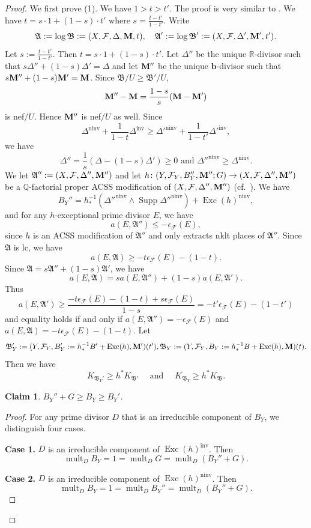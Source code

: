 \documentclass[11pt,reqno]{amsart}
\numberwithin{equation}{section}
\newcommand{\bb}{\bm{b}}
\newcommand{\Mm}{{\bf{M}}}
\newcommand{\Exc}{\operatorname{Exc}}
\newcommand{\ninv}{\operatorname{ninv}}
\newcommand{\inv}{\operatorname{inv}}
\newcommand{\Supp}{\operatorname{Supp}}
\newcommand{\mult}{\operatorname{mult}}
\newcommand{\Aa}{{\mathfrak{A}}}
\newcommand{\Bb}{{\mathfrak{B}}}
\newcommand{\Ff}{\mathcal{F}}
\newtheorem{claim}[thm]{Claim}
\theoremstyle{definition}
\begin{document}
\begin{proof}
We first prove (1). We have $1>t>t'$. The proof is very similar to \cite[Proof of Proposition~3.3]{Cas+24}. We have $t=s\cdot 1+(1-s)\cdot t'$ where $s=\frac{t-t'}{1-t'}$. Write
$$\Aa:=\log\Bb:=(X,\Ff,\Delta,\Mm,t),\quad \Aa':=\log\Bb':=(X,\Ff,\Delta',\Mm',t').$$
Let $s:=\frac{t-t'}{1-t'}$. Then $t=s\cdot 1+(1-s)\cdot t'$. Let $\Delta''$ be the unique $\mathbb R$-divisor such that $s\Delta''+(1-s)\Delta'=\Delta$ and let $\Mm''$ be the unique $\bb$-divisor such that $s\Mm''+(1-s)\Mm'=\Mm$. Since $\Bb/U\geq\Bb'/U$,
$$\Mm''-\Mm=\frac{1-s}{s}(\Mm-\Mm')$$
is nef$/U$. Hence $\Mm''$ is nef$/U$ as well. Since
$$\Delta^{\ninv}+\frac{1}{1-t}\Delta^{\inv}\geq\Delta'^{\ninv}+\frac{1}{1-t'}\Delta'^{\inv},$$
we have 
$$\Delta''=\frac{1}{s}(\Delta-(1-s)\Delta')\geq 0\text{ and }\Delta''^{\ninv}\geq\Delta^{\ninv}.$$
We let $\Aa'':=(X,\Ff,\Delta'',\Mm'')$ and let $h\colon (Y,\Ff_Y,B_Y'',\Mm'';G)\rightarrow (X,\Ff,\Delta'',\Mm'')$ be a $\mathbb Q$-factorial proper ACSS modification of $(X,\Ff,\Delta'',\Mm'')$ (cf.~\cite[Theorem~8.2.2]{CHLX23}). We have
$$B_Y''=h^{-1}_*(\Delta''^{\ninv}\wedge\Supp \Delta''^{\ninv})+\Exc(h)^{\ninv},$$
and for any $h$-exceptional prime divisor $E$, we have
$$a(E,\Aa'')\leq -\epsilon_{\Ff}(E),$$
since $h$ is an ACSS modification of $\Aa''$ and only extracts nklt places of $\Aa''$. 
Since $\Aa$ is lc, we have
$$a(E,\Aa)\geq -t\epsilon_{\Ff}(E)-(1-t).$$
Since $\Aa=s\Aa''+(1-s)\Aa'$, we have
$$a(E,\Aa)=sa(E,\Aa'')+(1-s)a(E,\Aa').$$
Thus
$$a(E,\Aa')\geq\frac{-t\epsilon_{\Ff}(E)-(1-t)+s\epsilon_{\Ff}(E)}{1-s}=-t'\epsilon_{\Ff}(E)-(1-t')$$
and equality holds if and only if $a(E,\Aa'')=-\epsilon_{\Ff}(E)$ and $a(E,\Aa)=-t\epsilon_{\Ff}(E)-(1-t)$. Let 
$$\Bb_{Y}':=(Y,\Ff_Y,B_{Y}':=h^{-1}_*B'+\Exc(h),\Mm')(t'),\Bb_Y:=(Y,\Ff_Y,B_{Y}:=h^{-1}_*B+\Exc(h),\Mm)(t).$$
Then we have 
$$K_{\Bb_{Y}'}\geq h^*K_{\Bb'}\quad \text{ and }\quad K_{\Bb_Y}\geq h^*K_{\Bb}.$$
\begin{claim}\label{claim: by+g and by'}
$B_Y''+G\geq B_{Y}\geq B_Y'$.
\end{claim}
\begin{proof}
    For any prime divisor $D$ that is an irreducible component of $B_Y$, we distinguish four cases.
    \medskip

    \noindent\textbf{Case 1.} $D$ is an irreducible component of $\Exc(h)^{\inv}$. Then
    $$\mult_DB_{Y}=1=\mult_DG=\mult_D(B_Y''+G).$$
    
    \medskip

    \noindent\textbf{Case 2.} $D$ is an irreducible component of $\Exc(h)^{\ninv}$. Then
    $$\mult_DB_{Y}=1=\mult_DB_Y''=\mult_D(B_Y''+G).$$


\end{proof}
\end{proof}
\end{document}
